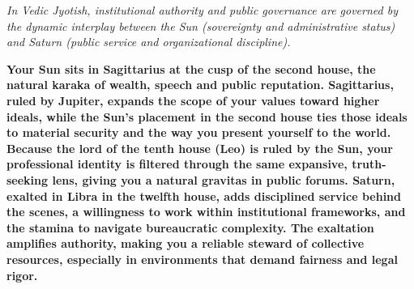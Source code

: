 


{\fontsize{9.5}{14}\selectfont\color{DeepSlate}\itshape In Vedic Jyotish, institutional authority and public governance are governed by the dynamic interplay between the Sun (sovereignty and administrative status) and Saturn (public service and organizational discipline).}\par\vspace{3.5mm}

\label{topic42}

{\fontsize{9.5}{13.8}\selectfont\bfseries\color{DeepSlate} Your Sun sits in Sagittarius at the cusp of the second house, the natural karaka of wealth, speech and public reputation. Sagittarius, ruled by Jupiter, expands the scope of your values toward higher ideals, while the Sun's placement in the second house ties those ideals to material security and the way you present yourself to the world. Because the lord of the tenth house (Leo) is ruled by the Sun, your professional identity is filtered through the same expansive, truth-seeking lens, giving you a natural gravitas in public forums. Saturn, exalted in Libra in the twelfth house, adds disciplined service behind the scenes, a willingness to work within institutional frameworks, and the stamina to navigate bureaucratic complexity. The exaltation amplifies authority, making you a reliable steward of collective resources, especially in environments that demand fairness and legal rigor.}\par\vspace{2mm}

